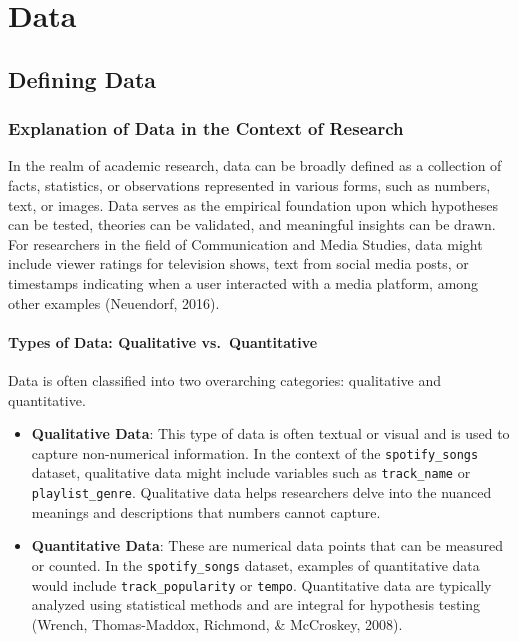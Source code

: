 \documentclass[
]{book}
\begin{document}
\chapter{Data}\label{data}

\section{Defining Data}\label{defining-data}

\subsection*{Explanation of Data in the Context of Research}\label{explanation-of-data-in-the-context-of-research}

In the realm of academic research, data can be broadly defined as a collection of facts, statistics, or observations represented in various forms, such as numbers, text, or images. Data serves as the empirical foundation upon which hypotheses can be tested, theories can be validated, and meaningful insights can be drawn. For researchers in the field of Communication and Media Studies, data might include viewer ratings for television shows, text from social media posts, or timestamps indicating when a user interacted with a media platform, among other examples (Neuendorf, 2016).

\subsubsection*{Types of Data: Qualitative vs.~Quantitative}\label{types-of-data-qualitative-vs.-quantitative}

Data is often classified into two overarching categories: qualitative and quantitative.

\begin{itemize}
\item
  \textbf{Qualitative Data}: This type of data is often textual or visual and is used to capture non-numerical information. In the context of the \texttt{spotify\_songs} dataset, qualitative data might include variables such as \texttt{track\_name} or \texttt{playlist\_genre}. Qualitative data helps researchers delve into the nuanced meanings and descriptions that numbers cannot capture.
\item
  \textbf{Quantitative Data}: These are numerical data points that can be measured or counted. In the \texttt{spotify\_songs} dataset, examples of quantitative data would include \texttt{track\_popularity} or \texttt{tempo}. Quantitative data are typically analyzed using statistical methods and are integral for hypothesis testing (Wrench, Thomas-Maddox, Richmond, \& McCroskey, 2008).
\end{itemize}
\end{document}
